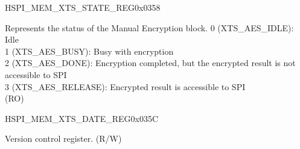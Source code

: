 \begin{register}{H}{SPI\_MEM\_XTS\_STATE\_REG}{0x0358}\label{regdesc:SPIMEMXTSSTATEREG}
%
%
\regnewline%
\begin{regdesc}\begin{reglist}
\label{fielddesc:SPIMEMXTSSTATE}\item [SPI\_MEM\_XTS\_STATE] Represents the status of the Manual Encryption block.
0 (XTS\_AES\_IDLE): Idle\\
1 (XTS\_AES\_BUSY): Busy with encryption\\
2 (XTS\_AES\_DONE): Encryption completed, but the encrypted result is not accessible to SPI\\
3 (XTS\_AES\_RELEASE): Encrypted result is accessible to SPI\\
(RO)
\end{reglist}\end{regdesc}
\end{register}


\begin{register}{H}{SPI\_MEM\_XTS\_DATE\_REG}{0x035C}\label{regdesc:SPIMEMXTSDATEREG}
%
%
\regnewline%
\begin{regdesc}\begin{reglist}
\label{fielddesc:SPIMEMXTSDATE}\item [SPI\_MEM\_XTS\_DATE] Version control register. (R/W)
\end{reglist}\end{regdesc}
\end{register}
